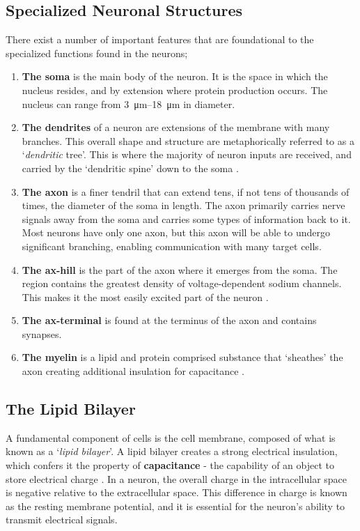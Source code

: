 \documentclass[../../Orator]{subfiles}
\begin{document}
\subsection{Specialized Neuronal Structures}
There exist a number of important features that are foundational to the specialized functions found in the neurons;
\begin{enumerate}
    \item \textbf{The \gls{soma}} is the main body of the neuron. It is the space in which the nucleus resides, and by extension where protein production occurs. The nucleus can range from \qtyrange{3}{18}{\um} in diameter.
    \item \textbf{The \glspl{dendrite}} of a neuron are extensions of the membrane with many branches. This overall shape and structure are metaphorically referred to as a `\textit{dendritic} tree'\footnotemark. This is where the majority of neuron inputs are received, and carried by the `dendritic spine' down to the \gls{soma} \cite{}. 
    \item \textbf{The \gls{axon}} is a finer tendril that can extend tens, if not tens of thousands of times, the diameter of the \gls{soma} in length. The \gls{axon} primarily carries nerve signals away from the \gls{soma} and carries some types of information back to it. Most neurons have only one \gls{axon}, but this \gls{axon} will be able to undergo significant branching, enabling communication with many target cells. 
    \item \textbf{The \gls{ax-hill}} is the part of the \gls{axon} where it emerges from the \gls{soma}. The region contains the greatest density of voltage-dependent sodium channels. This makes it the most easily excited part of the neuron \cite{}. 
    \item \textbf{The \gls{ax-terminal}} is found at the terminus of the \gls{axon} and contains synapses. 
    \item \textbf{The myelin} is a lipid and protein comprised substance that `sheathes' the \gls{axon} creating additional insulation for capacitance \cite{}.
\end{enumerate}


\subsection{The Lipid Bilayer} 
A fundamental component of cells is the cell membrane, composed of what is known as a `\textit{lipid bilayer}'\footnotemark. A lipid bilayer creates a strong electrical insulation, 
which confers it the property of \textbf{capacitance} - the capability of an object to store electrical charge \cite{}.  
In a neuron, the overall charge in the intracellular space is negative relative to the extracellular space. 
This difference in charge is known as the resting membrane potential, and it is essential for the neuron's ability to transmit electrical signals. 
\end{document}
